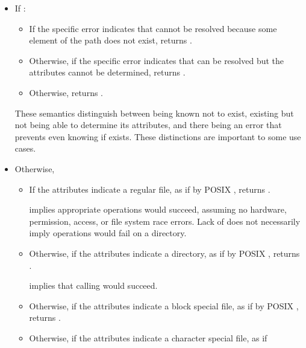 \begin{itemdescr}
\pnum
\returns
\begin{itemize}
\item
If :
\begin{itemize}
\item If the specific error indicates that  cannot be resolved
      because some element of the path does not exist, returns
      .
\item Otherwise, if the specific error indicates that  can be resolved
      but the attributes cannot be determined, returns
      .
\item Otherwise, returns .
\end{itemize}
\begin{note}
These semantics distinguish between  being known not to exist,  existing but not being able to determine its attributes,
        and there being an error that prevents even knowing if  exists. These
        distinctions are important to some use cases.
\end{note}
\item
Otherwise,
\begin{itemize}
\item If the attributes indicate a regular file, as if by POSIX ,
      returns .
\begin{note}
       implies appropriate  operations
      would succeed, assuming no hardware, permission, access, or file system
      race errors. Lack of  does not necessarily imply
       operations would fail on a directory.
\end{note}
\item Otherwise, if the attributes indicate a directory, as if by POSIX
      , returns .
      \begin{note}
 implies that calling
       would succeed.
\end{note}
\item Otherwise, if the attributes indicate a block special file, as if by
      POSIX , returns .
\item Otherwise, if the attributes indicate a character special file, as if

\end{itemize}
\end{itemize}
\end{itemdescr}
